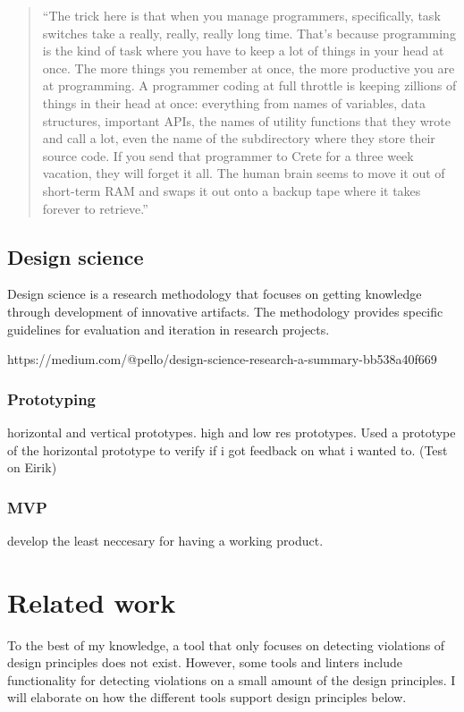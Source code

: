 \documentclass{article}
\begin{document}
\begin{quote}
    ``The trick here is that when you manage programmers, specifically, task switches take a really, really, really long time. That’s because programming is the kind of task where you have to keep a lot of things in your head at once. The more things you remember at once, the more productive you are at programming. A programmer coding at full throttle is keeping zillions of things in their head at once: everything from names of variables, data structures, important APIs, the names of utility functions that they wrote and call a lot, even the name of the subdirectory where they store their source code. If you send that programmer to Crete for a three week vacation, they will forget it all. The human brain seems to move it out of short-term RAM and swaps it out onto a backup tape where it takes forever to retrieve.''
\end{quote}
\cite{human-context-switching}



\subsection{Design science}
Design science is a research methodology that focuses on getting knowledge through development of innovative artifacts. The methodology provides specific guidelines for evaluation and iteration in research projects.

https://medium.com/@pello/design-science-research-a-summary-bb538a40f669

\subsubsection{Prototyping}

horizontal and vertical prototypes. high and low res prototypes.
Used a prototype of the horizontal prototype to verify if i got feedback on what i wanted to. (Test on Eirik)


\subsubsection{MVP}
develop the least neccesary for having a working product.



\section{Related work}
\label{relatedwork}
To the best of my knowledge, a tool that only focuses on detecting violations of design principles does not exist. However, some tools and linters include functionality for detecting violations on a small amount of the design principles. I will elaborate on how the different tools support design principles below.
\end{document}
